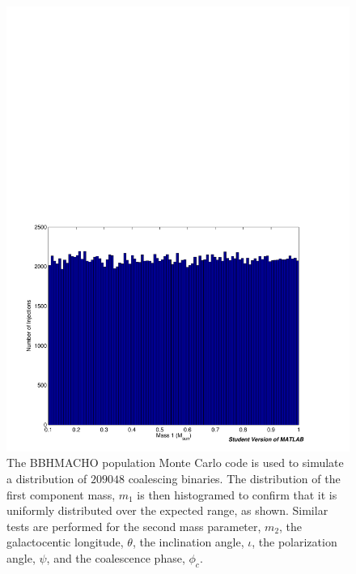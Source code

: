 \begin{figure}[p]
\begin{center}
\includegraphics[width=\linewidth]{figures/macho/m1_hist}
\end{center}
\caption{\label{f:m1_hist}%
The BBHMACHO population Monte Carlo code is used to simulate a distribution of
$209048$ coalescing binaries. The distribution of the first component mass,
$m_1$ is then histogramed to confirm that it is uniformly distributed over the
expected range, as shown. Similar tests are performed for the second mass
parameter, $m_2$, the galactocentic longitude, $\theta$, the inclination
angle, $\iota$, the polarization angle, $\psi$, and the coalescence phase,
$\phi_c$.
}
\end{figure}


